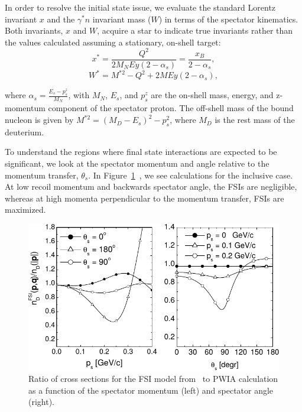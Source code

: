 In order to resolve the initial state issue, we evaluate the standard Lorentz 
invariant $x$ and the $\gamma^{*}n$ invariant mass ($W$) in terms of the 
spectator kinematics. Both invariants, $x$ and $W$, acquire a star to indicate  
true invariants rather than the values calculated assuming a stationary, 
on-shell target:
\begin{equation}
   x^* = \frac{Q^2}{2M_{N}Ey (2-\alpha_s)} = \frac{x_B}{2-\alpha_s},
\end{equation}
\begin{equation}
   W^* = M^{*2} - Q^2+ 2MEy(2-\alpha_s),
\end{equation}

where $\alpha_s = \frac{E_s - p^{z}_{s}}{M_N}$, with $M_N$, $E_s$, and 
$p^{z}_{s}$ are the on-shell mass, energy, and z-momentum component of the 
spectator proton. The off-shell mass of the bound nucleon is given by $M^{*2} = 
(M_D - E_s)^{2} - p^{2}_{s}$, where $M_D$ is the rest mass of the deuterium.

To understand the regions where final state interactions are expected to be 
significant, we look at the spectator momentum and angle relative to the 
momentum transfer, $\theta_s$.  In 
Figure~\ref{fig:deuteronFSI}~\cite{CiofidegliAtti:2003pb,CiofidegliAtti:2002as}, 
we see calculations for the inclusive case.  At low recoil momentum and 
backwards spectator angle, the FSIs are negligible, whereas at high momenta 
perpendicular to the momentum transfer, FSIs are maximized.

\begin{figure}
   \centering
   \includegraphics{figures/FSI_quasielastic_Atti_2003.pdf}
   \caption{\label{fig:deuteronFSI} Ratio of cross sections for the FSI model 
   from~\cite{CiofidegliAtti:2003pb} to PWIA calculation as a function of
   the spectator momentum (left) and spectator angle (right).}
\end{figure}

